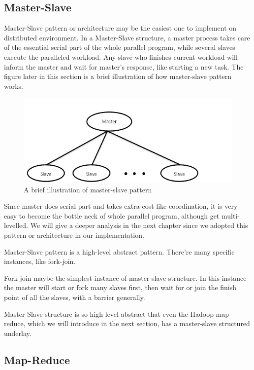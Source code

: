 \documentclass[12pt,a4paper]{report}
\begin{document}
\subsection{Master-Slave}

Master-Slave pattern or architecture may be the easiest one to implement on distributed environment. In a Master-Slave structure, a master process takes care of the essential serial part of the whole parallel program, while several slaves execute the paralleled workload. Any slave who finishes current workload will inform the master and wait for master's response, like starting a new task. The figure later in this section is a brief illustration of how master-slave pattern works.

\begin{figure}[ht]
\centering
\includegraphics[width=120mm]{master-slave-brief.png}
\caption{A brief illustration of master-slave pattern}
\end{figure}

Since master does serial part and takes extra cost like coordination, it is very easy to become the bottle neck of whole parallel program, although get multi-levelled. We will give a deeper analysis in the next chapter since we adopted this pattern or architecture in our implementation.

Master-Slave pattern is a high-level abstract pattern. There're many specific instances, like fork-join. 

Fork-join maybe the simplest instance of master-slave structure. In this instance the master will start or fork many slaves first, then wait for or join the finish point of all the slaves, with a barrier generally.

Master-Slave structure is so high-level abstract that even the Hadoop map-reduce, which we will introduce in the next section, has a master-slave structured underlay.

\subsection{Map-Reduce}
\end{document}
